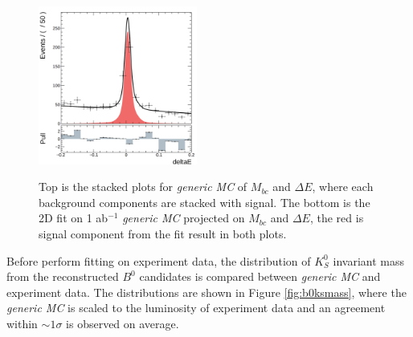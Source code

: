 \begin{figure}[H]
\begin{minipage}[b]{0.5\linewidth}
	\end{minipage}
	\begin{minipage}[b]{0.5\linewidth}
		\centering 
		\includegraphics[height=5.2cm]{figures/dE-hist-2d}
		\label{}
	\end{minipage}
	\caption{Top is the stacked plots for \textit{generic MC} of $M_{bc}$ and $\Delta E$, where each background components are stacked with signal. The bottom is the 2D fit on 1 ab$^{-1}$ \textit{generic MC} projected on $M_{bc}$ and $\Delta E$, the red is signal component from the fit result in both plots.}
	\label{fig:2Dgen}
\end{figure}

Before perform fitting on experiment data, the distribution of $K_S^0$ invariant mass from the reconstructed $B^0$ candidates is compared between \textit{generic MC} and experiment data. The distributions are shown in Figure \ref{fig:b0ksmass}, where the \textit{generic MC} is scaled to the luminosity of experiment data and an agreement within $\sim 1\sigma$ is observed on average. 

